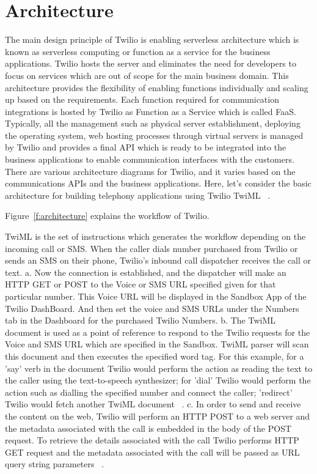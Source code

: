 {\section{Architecture}

The main design principle of Twilio is enabling serverless architecture which is
known as serverless computing or function as a service for the business 
applications. Twilio hosts the server and eliminates the need for developers to 
focus on services which are out of scope for the main business domain. This 
architecture provides the flexibility of enabling functions individually and 
scaling up based on the requirements. Each function required for communication 
integrations is hosted by Twilio as Function as a Service which is called FaaS. 
Typically, all the management such as physical server establishment, deploying 
the operating system, web hosting processes through virtual servers is managed 
by Twilio and provides a final API which is ready to be integrated into the 
business applications to enable communication interfaces with the customers. 
There are various architecture diagrams for Twilio, and it varies based on the 
communications APIs and the business applications. Here, let's consider the 
basic architecture for building telephony applications using Twilio TwiML
~\cite{hid-sp18-406-twilio-architecture1}.

Figure~\ref{f:architecture} explains the workflow of Twilio.
  

TwiML is the set of instructions which generates the workflow depending on the 
incoming call or SMS. When the caller dials number purchased from Twilio 
or sends an SMS on their phone, Twilio's inbound call dispatcher receives the 
call or text. 
a. Now the connection is established, and the dispatcher will make an HTTP GET 
or POST to the Voice or SMS URL specified given for that particular number. 
This Voice URL will be displayed in the Sandbox App of the Twilio DashBoard. 
And then set the voice and SMS URLs under the Numbers tab in the Dashboard for 
the purchased Twilio Numbers.
b. The TwiML document is used as a point of reference to respond to the Twilio 
requests for the Voice and SMS URL which are specified in the Sandbox. TwiML 
parser will scan this document and then executes the specified word tag. For 
this example, for a 'say' verb in the document Twilio would perform the action 
as reading the text to the caller using the text-to-speech synthesizer; for 
'dial' Twilio would perform the action such as dialling the specified number 
and connect the caller; 'redirect' Twilio would fetch another TwiML document
~\cite{hid-sp18-406-twilio-architecture2}.
c. In order to send and receive the content on the web, Twilio will perform an 
HTTP POST to a web server and the metadata associated with the call is embedded
in the body of the POST request. To retrieve the details associated with the 
call Twilio performs HTTP GET request and the metadata associated with the call
will be passed as URL query string parameters
~\cite{hid-sp18-406-twilio-architecture3}.


}
